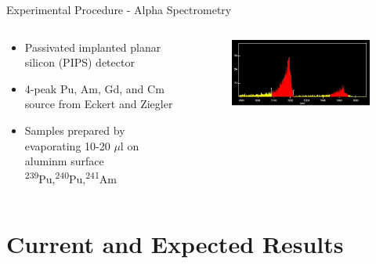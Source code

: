 \documentclass{beamer}
\newcommand{\tss}{\textsuperscript}
\begin{document}
\begin{frame}{Experimental Procedure - Alpha Spectrometry}
  \begin{columns}
    \begin{column}{0.4\textwidth}
      \vspace{-10mm}
      \begin{itemize}
      \item{Passivated implanted planar silicon (PIPS) detector}
      \item{4-peak Pu, Am, Gd, and Cm source from Eckert and Ziegler}
      \item{Samples prepared by evaporating 10-20 $\mu$l on aluminm surface}
      {\tiny\tss{239}Pu,\tss{240}Pu,\tss{241}Am}
      \end{itemize}
    \end{column}
    \begin{column}{0.7\textwidth}
      \begin{figure}[H]
        \vspace*{-1cm}
        \begin{center}
	  \includegraphics[scale = 0.55]{figures/alpha}
	\end{center}
      \end{figure}
    \end{column}
  \end{columns}
\end{frame}



\section{Current and Expected Results}
\begin{frame}
  \sectionpage
\end{frame}
\end{document}
